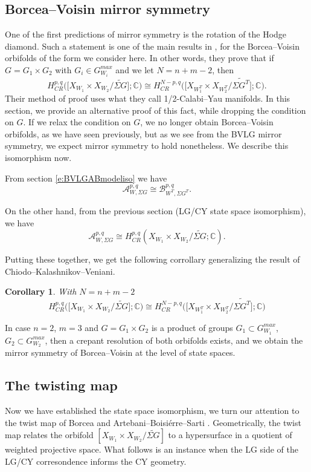 \documentclass[10pt, letterpaper]{amsart}
\newtheorem{cor}[thm]{Corollary}
\theoremstyle{remark}
\newcommand{\CC}{\mathbb C}
\newcommand{\sA}{\mathscr{A}}
\newcommand{\sB}{\mathscr{B}}
\newcommand{\s}[1]{\Sigma #1}
\begin{document}
\subsection{Borcea--Voisin mirror symmetry}
One of the first predictions of mirror symmetry is the rotation of the Hodge diamond. Such a statement is one of the main results in \cite{CKV}, for the Borcea--Voisin orbifolds of the form we consider here. In other words, they prove that if $G=G_1\times G_2$ with $G_i\in G_{W_i}^{max}$ and we let $N=n+m-2$, then 
\[
H^{p,q}_{CR}\big(\big[X_{W_1}\times X_{W_2}/\widetilde{\s{G}}\big];\CC\big)\cong H^{N-p,q}_{CR}\big(\big[X_{W_1^T}\times X_{W_2^T}/\widetilde{\s{G^T}}\big];\CC\big).
\]
Their method of proof uses what they call 1/2-Calabi--Yau manifolds. In this section, we provide an alternative proof of this fact, while dropping the condition on $G$. 
If we relax the condition on $G$, we no longer obtain Borcea--Voisin orbifolds, as we have seen previously, but as we see from the BVLG mirror symmetry, we expect mirror symmetry to hold nonetheless. We describe this isomorphism now. 

From section \ref{e:BVLGABmodeliso} we have 
\[
\sA_{W,\s{G}}^{p,q}\cong \sB_{W^T,\s{G^T}}^{p,q}.
\]

On the other hand, from the previous section (LG/CY state space isomorphism), we have 
\[
\sA_{W,\s{G}}^{p,q}\cong H^{p,q}_{CR}(X_{W_1}\times X_{W_2}/\widetilde{\s{G}};\CC). 
\]

Putting these together, we get the following corrollary generalizing the result of Chiodo--Kalashnikov--Veniani.
\begin{cor}With $N=n+m-2$
	\[
	H^{p,q}_{CR}\big(\big[X_{W_1}\times X_{W_2}/\widetilde{\s{G}}\big];\CC\big)\cong H^{N-p,q}_{CR}\big(\big[X_{W_1^T}\times X_{W_2^T}/\widetilde{\s{G^T}}\big];\CC\big)
	\]
\end{cor}

In case $n=2$, $m=3$ and $G=G_1\times G_2$ is a product of groups $G_1\subset G_{W_1}^{max}$, $G_2\subset G_{W_2}^{max}$, then a crepant resolution of both orbifolds exists, and we obtain the mirror symmetry of Borcea--Voisin at the level of state spaces. 


\subsection{The twisting map}\label{ss:twistmap}
Now we have established the state space isomorphism, we turn our attention to the twist map of Borcea \cite{Borcea} and Artebani--Boisi\'erre--Sarti \cite{ABS}. Geometrically, the twist map relates the orbifold $[X_{W_1}\times X_{W_2}/\widetilde{\s{G}}]$ to a hypersurface in a quotient of weighted projective space. What follows is an instance when the LG side of the LG/CY corresondence informs the CY geometry. 
\end{document}
